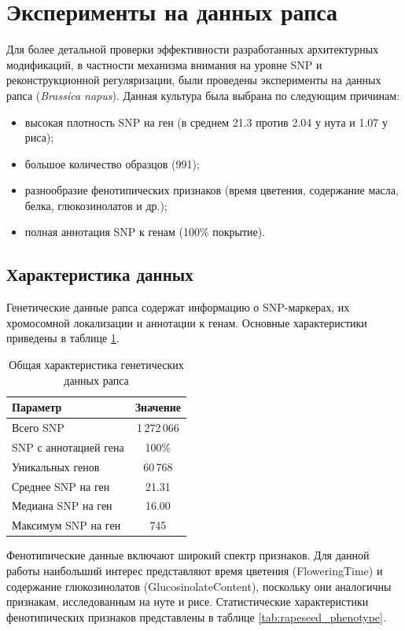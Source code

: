 \section{Эксперименты на данных рапса}

Для более детальной проверки эффективности разработанных архитектурных 
модификаций, в частности механизма внимания на уровне SNP и 
реконструкционной регуляризации, были проведены эксперименты на данных 
рапса (\textit{Brassica napus}). Данная культура была выбрана по следующим 
причинам:
\begin{itemize}
	\item высокая плотность SNP на ген (в среднем 21.3 против 2.04 у нута 
	и 1.07 у риса);
	\item большое количество образцов (991);
	\item разнообразие фенотипических признаков (время цветения, 
	содержание масла, белка, глюкозинолатов и др.);
	\item полная аннотация SNP к генам (100\% покрытие).
\end{itemize}

\subsection{Характеристика данных}

Генетические данные рапса содержат информацию о SNP-маркерах, их 
хромосомной локализации и аннотации к генам. Основные характеристики 
приведены в таблице \ref{tab:rapeseed_genetic}.

\begin{table}
	\centering
	\caption{Общая характеристика генетических данных рапса}
	\label{tab:rapeseed_genetic}
	\begin{tabular}{|l|c|}
		\hline
		\textbf{Параметр} & \textbf{Значение} \\ \hline
		Всего SNP & 1\,272\,066 \\ \hline
		SNP с аннотацией гена & 100\% \\ \hline
		Уникальных генов & 60\,768 \\ \hline
		Среднее SNP на ген & 21.31 \\ \hline
		Медиана SNP на ген & 16.00 \\ \hline
		Максимум SNP на ген & 745 \\ \hline
	\end{tabular}
\end{table}

Фенотипические данные включают широкий спектр признаков. Для данной 
работы наибольший интерес представляют время цветения (FloweringTime) 
и содержание глюкозинолатов (GlucosinolateContent), поскольку они 
аналогичны признакам, исследованным на нуте и рисе. Статистические 
характеристики фенотипических признаков представлены в таблице 
\ref{tab:rapeseed_phenotype}.

